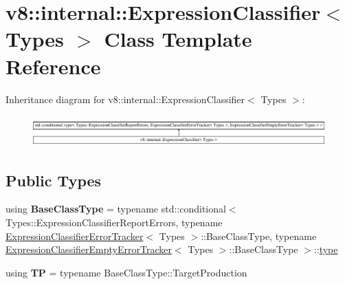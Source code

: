 \hypertarget{classv8_1_1internal_1_1ExpressionClassifier}{}\section{v8\+:\+:internal\+:\+:Expression\+Classifier$<$ Types $>$ Class Template Reference}
\label{classv8_1_1internal_1_1ExpressionClassifier}
Inheritance diagram for v8\+:\+:internal\+:\+:Expression\+Classifier$<$ Types $>$\+:\begin{figure}[H]
\begin{center}
\leavevmode
\includegraphics[height=1.203008cm]{classv8_1_1internal_1_1ExpressionClassifier}
\end{center}
\end{figure}
\subsection*{Public Types}
\begin{DoxyCompactItemize}
\item 
\mbox{\label{classv8_1_1internal_1_1ExpressionClassifier_a914f328bdc63b8cd3e7d7977a86353cd}} 
using {\bfseries Base\+Class\+Type} = typename std\+::conditional$<$ Types\+::\+Expression\+Classifier\+Report\+Errors, typename \mbox{\hyperlink{classv8_1_1internal_1_1ExpressionClassifierErrorTracker}{Expression\+Classifier\+Error\+Tracker}}$<$ Types $>$\+::Base\+Class\+Type, typename \mbox{\hyperlink{classv8_1_1internal_1_1ExpressionClassifierEmptyErrorTracker}{Expression\+Classifier\+Empty\+Error\+Tracker}}$<$ Types $>$\+::Base\+Class\+Type $>$\+::\mbox{\hyperlink{classstd_1_1conditional_1_1type}{type}}
\item 
\mbox{\label{classv8_1_1internal_1_1ExpressionClassifier_a821fb158c4573e841ec4573025a41b15}} 
using {\bfseries TP} = typename Base\+Class\+Type\+::\+Target\+Production
\end{DoxyCompactItemize}
